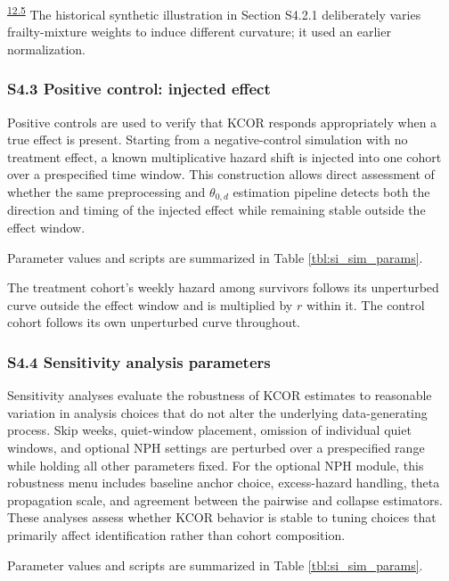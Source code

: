 \documentclass[
]{article}
\begin{document}
\textsuperscript{\hyperlink{issue-12.5}{12.5}} {\color{red} The historical synthetic illustration in Section S4.2.1 deliberately varies frailty-mixture weights to induce different curvature; it used an earlier normalization.}

\subsubsection{S4.3 Positive control: injected effect}\label{s4.3-positive-control-injected-effect}

Positive controls are used to verify that KCOR responds appropriately when a true effect is present. Starting from a negative-control simulation with no treatment effect, a known multiplicative hazard shift is injected into one cohort over a prespecified time window. This construction allows direct assessment of whether the same preprocessing and \(\theta_{0,d}\) estimation pipeline detects both the direction and timing of the injected effect while remaining stable outside the effect window.

Parameter values and scripts are summarized in Table \ref{tbl:si_sim_params}.

The treatment cohort's weekly hazard among survivors follows its unperturbed curve outside the effect window and is multiplied by \(r\) within it. The control cohort follows its own unperturbed curve throughout.

\subsubsection{S4.4 Sensitivity analysis parameters}\label{s4.4-sensitivity-analysis-parameters}

Sensitivity analyses evaluate the robustness of KCOR estimates to reasonable variation in analysis choices that do not alter the underlying data-generating process. Skip weeks, quiet-window placement, omission of individual quiet windows, and optional NPH settings are perturbed over a prespecified range while holding all other parameters fixed. For the optional NPH module, this robustness menu includes baseline anchor choice, excess-hazard handling, theta propagation scale, and agreement between the pairwise and collapse estimators. These analyses assess whether KCOR behavior is stable to tuning choices that primarily affect identification rather than cohort composition.

Parameter values and scripts are summarized in Table \ref{tbl:si_sim_params}.
\end{document}
